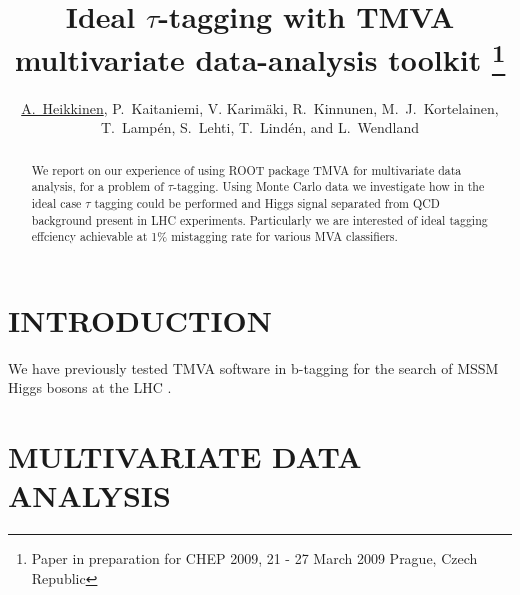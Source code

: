 \documentclass[twoside,floatfix,a4wide]{revtex4}
\numberwithin{equation}{section} %
\begin{document}
\title{Ideal $\tau$-tagging with TMVA multivariate data-analysis toolkit
\footnote{Paper \cite{ah09bProceedings} in preparation for CHEP 2009, 21 - 27 March 2009 Prague, 
Czech Republic}}

\author{\underline{A.~Heikkinen}, P.~Kaitaniemi, V. Karim\"{a}ki,
 R.~Kinnunen,  M.~J.~Kortelainen, T.~Lamp\'{e}n, S.~Lehti, T.~Lind\'{e}n, and L.~Wendland} 

\begin{abstract}
We report on our experience of using  ROOT package TMVA for multivariate data analysis,   
for a problem of $\tau$-tagging. 
Using Monte Carlo data 
we investigate how in the ideal case $\tau$ tagging could be performed and
Higgs signal separated from QCD background present in LHC experiments.
Particularly we are interested of ideal tagging effciency  achievable at 1\% mistagging rate
for various MVA classifiers.



\end{abstract}

\maketitle

\thispagestyle{fancy}

\section{INTRODUCTION \label{section:intro}}
We have previously tested TMVA software in b-tagging for the search of MSSM Higgs bosons 
at the LHC \cite{heikkinen07lProceedings}.
\section{MULTIVARIATE DATA ANALYSIS}
\end{document}
